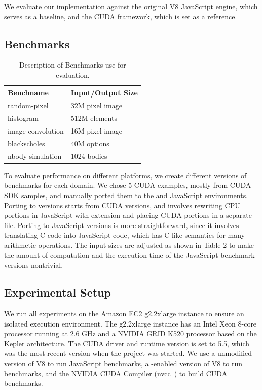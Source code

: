 We evaluate our \name implementation against the original V8 JavaScript
engine, which serves as a baseline, and the CUDA framework, which is set as a
reference.

\subsection{Benchmarks}
\begin{table}
	\begin{center}
		\begin{tabular}{| l | l |}
			\hline
			Benchname & Input/Output Size \\
			\hline
			random-pixel & 32M pixel image \\
			\hline
			histogram & 512M elements \\
			\hline
			image-convolution & 16M pixel image \\
			\hline
			blackscholes & 40M options \\
			\hline
			nbody-simulation & 1024 bodies \\
			\hline
		\end{tabular}
	\end{center}
	\caption{Description of Benchmarks use for evaluation.}
	\label{benchmark-table}
\end{table}

To evaluate performance on different platforms, we create different versions of
benchmarks for each domain. We chose 5 CUDA examples, mostly from CUDA SDK
samples, and manually ported them to the \name and JavaScript environments.
Porting to \name versions starts from CUDA versions, and involves rewriting CPU
portions in JavaScript with \name extension and placing CUDA portions in a
separate file. Porting to JavaScript versions is more straightforward, since it
involves translating C code into JavaScript code, which has C-like semantics
for many arithmetic operations.  The input sizes are adjusted as shown in Table
2 to make the amount of computation and the execution time of the JavaScript
benchmark versions nontrivial.

\subsection{Experimental Setup} We run all experiments on the Amazon EC2
\cite{amazonEC2} g2.2xlarge instance to ensure an isolated execution
environment. The g2.2xlarge instance has an Intel Xeon 8-core processor running
at 2.6 GHz and a NVIDIA GRID K520 processor based on the Kepler architecture.
The CUDA driver and runtime version is set to 5.5, which was the most recent
version when the project was started. We use a unmodified version of V8 to run JavaScript benchmarks, a \name-enabled version of V8 to run \name benchmarks, and the NVIDIA CUDA Compiler (nvcc~\cite{nvcc}) to build CUDA benchmarks.

